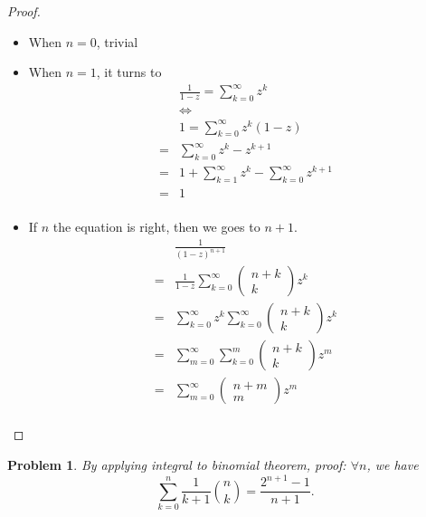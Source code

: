 \documentclass{ctexart}
\newtheorem{problem}{\textbf{Problem}}
\renewcommand{\(}{\left(}
\renewcommand{\)}{\right)}
\newcommand{\Cb}[2]{\binom{#1}{#2}}
\newcommand{\Iff}{\Leftrightarrow}
\begin{document}
\begin{proof}
\begin{itemize}
\item When $n=0$, trivial
\item When $n=1$, it turns to
\begin{equation}
\begin{aligned}
&\frac{1}{1-z}=\sum_{k=0}^{\infty} z^k\\
& \Iff \\
&1=\sum_{k=0}^{\infty} z^k(1-z)\\
=&\sum_{k=0}^{\infty}z^k-z^{k+1}\\
=&1+\sum_{k=1}^{\infty}z^{k}-\sum_{k=0}^{\infty}z^{k+1}\\
=&1\\
\end{aligned}
\end{equation}

\item If $n$ the equation is right, then we goes to $n+1$.
\begin{equation}
\begin{aligned}
&\frac{1}{(1-z)^{n+1}}\\
=&\frac{1}{1-z}\sum_{k=0}^{\infty}\left(\begin{array}{c}
n+k \\
k
\end{array}\right) z^k\\
=&\sum_{k=0}^{\infty} z^k\sum_{k=0}^{\infty}\left(\begin{array}{c}
n+k \\
k
\end{array}\right) z^k\\
=&\sum_{m=0}^{\infty}\sum_{k=0}^{m}\(\begin{array}{c}
n+k\\
k
\end{array}\)z^m\\
=&\sum_{m=0}^{\infty}
\(\begin{array}{c}
n+m\\
m
\end{array}\)z^m\\
\end{aligned}
\end{equation}
\end{itemize}
\end{proof}


\begin{problem}
By applying integral to binomial theorem, proof:
$\forall n$,  we have
$$
\sum_{k=0}^{n}\frac{1}{k+1}\Cb{n}{k}=\frac{2^{n+1}-1}{n+1} .
$$
\end{problem}
\end{document}
